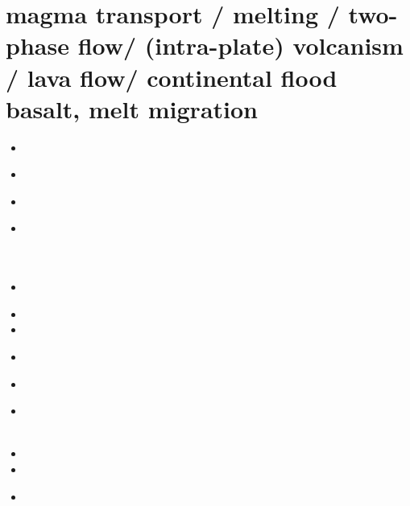 \section{magma transport / melting / two-phase flow/ (intra-plate) 
volcanism / lava flow/ continental flood basalt, melt migration}

\begin{small}
\begin{itemize}
\item[\nineteeneightyfour] 
 \\
\item[\nineteeneightyfive] 
 \\
\item[\nineteeneightysix] 
 \\
\item[\nineteeneightyseven] 
 \\
 \\
 \\
\item[\nineteeneightyeight] 
 \\
\item[\nineteeneightynine]
\item[\nineteenninety] 
\item[\nineteenninetythree] 
 \\
\item[\nineteenninetyfour] 
 \\
\item[\nineteenninetyfive] 
 \\
 \\
\item[\nineteenninetysix] 
\item[\nineteenninetyeight] 
\item[\nineteenninetynine] 
 \\

\end{itemize}
\end{small}
